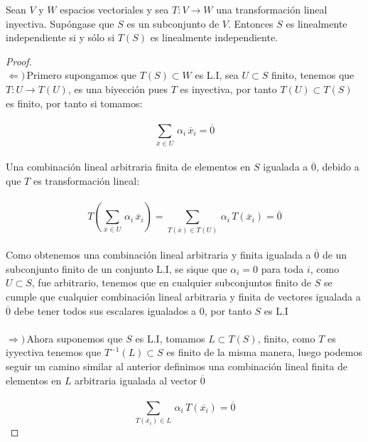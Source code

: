 \documentclass[11pt]{article}
\numberwithin{equation}{section}
\begin{document}
\begin{Problema}{} Sean $V$ y $W$ espacios vectoriales y sea $T: V \to W$ una transformación lineal inyectiva. Supóngase que $S$ es un subconjunto de $V$. 
    Entonces $S$ es linealmente independiente si y sólo si $T(S)$ es linealmente independiente.
\end{Problema}
\begin{proof}
    \,\\
    $\Leftarrow)$\,Primero supongamos que $T(S)\subset W$ es L.I, sea $U\subset S$ finito, tenemos que
    $T:U\rightarrow T(U)$, es una biyecci\'on pues $T$ es inyectiva, por tanto $T(U)\subset T(S)$ es finito, por tanto si tomamos:\,\\
    \,\\
    \begin{equation*}
        \sum_{\overline{x}\in U}\,\alpha_i\,\overline{x}_i=\overline{0}
    \end{equation*}\,\\
    Una combinaci\'on lineal arbitraria finita de elementos en $S$ igualada a $\overline{0}$, debido a que $T$ es transformaci\'on lineal:\,\\
    \,\\
    \begin{equation*}
        T\left(\sum_{\overline{x}\in U}\,\alpha_i\,\overline{x}_i\right)=\sum_{T(\overline{x})\in T(U)}\,\alpha_i\,T(\overline{x}_i)=\overline{0}
    \end{equation*}\,\\
    Como obtenemos una combinaci\'on lineal arbitraria y finita igualada a $\overline{0}$ de un subconjunto finito de un conjunto L.I, se
    sique que $\alpha_i=0$ para toda $i$, como $U\subset S$, fue arbitrario, tenemos que en cualquier subconjuntos
    finito de $S$ se cumple que cualquier combinaci\'on lineal arbitraria y finita de vectores igualada a $\overline{0}$ debe tener 
    todos sus escalares igualados a $0$, por tanto $S$ es L.I\,\\
    \,\\
    $\Rightarrow)$\,Ahora suponemos que $S$ es L.I, tomamos $L\subset T(S)$, finito, como
    $T$ es iyyectiva tenemos que $T^{-1}(L)\subset S$ es finito de la misma manera, luego podemos seguir un camino similar al anterior
    definimos una combinación lineal finita de elementos en $L$ arbitraria igualada al vector $\overline{0}$\,\\
    \,\\
    \begin{equation*}
        \sum_{T(\overline{x_i})\in L}\,\alpha_i\,T(\overline{x_i})=\overline{0}

\end{equation*}
\end{proof}
\end{document}
